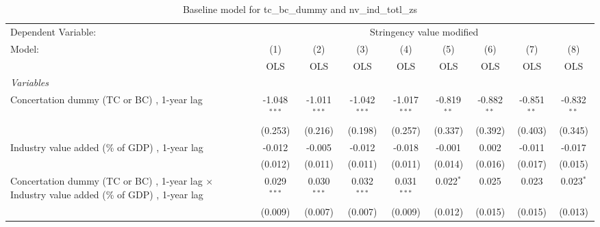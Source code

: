 
\begin{table}[htbp]
   \caption{Baseline model for tc\_bc\_dummy and nv\_ind\_totl\_zs}
   \centering
   \begin{tabular}{lcccccccc}
      \toprule
      Dependent Variable: & \multicolumn{8}{c}{Stringency value modified}\\
      Model:                                                                                              & (1)            & (2)            & (3)            & (4)            & (5)           & (6)           & (7)           & (8)\\  
                                                                                                          &  OLS           & OLS            & OLS            & OLS            & OLS           & OLS           & OLS           & OLS\\  
      \midrule
      \emph{Variables}\\
      Concertation dummy (TC or BC) , 1-year lag                                                          & -1.048$^{***}$ & -1.011$^{***}$ & -1.042$^{***}$ & -1.017$^{***}$ & -0.819$^{**}$ & -0.882$^{**}$ & -0.851$^{**}$ & -0.832$^{**}$\\   
                                                                                                          & (0.253)        & (0.216)        & (0.198)        & (0.257)        & (0.337)       & (0.392)       & (0.403)       & (0.345)\\   
      Industry value added (\% of GDP) , 1-year lag                                                       & -0.012         & -0.005         & -0.012         & -0.018         & -0.001        & 0.002         & -0.011        & -0.017\\   
                                                                                                          & (0.012)        & (0.011)        & (0.011)        & (0.011)        & (0.014)       & (0.016)       & (0.017)       & (0.015)\\   
      Concertation dummy (TC or BC) , 1-year lag $\times$ Industry value added (\% of GDP) , 1-year lag   & 0.029$^{***}$  & 0.030$^{***}$  & 0.032$^{***}$  & 0.031$^{***}$  & 0.022$^{*}$   & 0.025         & 0.023         & 0.023$^{*}$\\   
                                                                                                          & (0.009)        & (0.007)        & (0.007)        & (0.009)        & (0.012)       & (0.015)       & (0.015)       & (0.013)\\   

\end{tabular}
\end{table}
